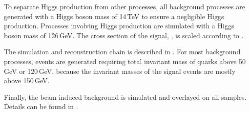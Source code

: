 To separate Higgs production from other processes, all background processes are generated with a Higgs boson mass of 14\,TeV to ensure a negligible Higgs production. Processes involving Higgs production are simulated with a Higgs boson mass of 126\,GeV. The cross section of the signal, \eeToHHbbWW, is scaled according to \cite{Dittmaier:2012vm}.


The simulation and reconstruction chain is described in . For most background processes, events are generated requiring total invariant mass of quarks above 50\,GeV or 120\,GeV, because the invariant masses of the signal events are mostly above 150\,GeV.



Finally, the beam induced background \ggHad is simulated and overlayed on all samples. Details can be found in .


